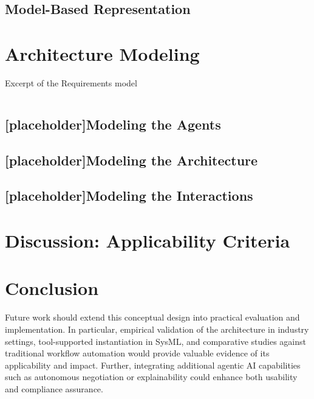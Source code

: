 \subsection{Model-Based Representation}\label{subsec:req-model}


\section{Architecture Modeling}\label{sec:mod-mas}
\begin{listing}[h]
    \caption{Excerpt of the Requirements model}
    \inputminted[firstline=1,lastline=25]{text}{ressources/models/requirements.sysml}
\end{listing}
\subsection{[placeholder]Modeling the Agents}\label{subsec:mod-agents}
\subsection{[placeholder]Modeling the Architecture}\label{subsec:mod-arch}
\subsection{[placeholder]Modeling the Interactions}\label{subsec:mod-interactions}

\section{Discussion: Applicability Criteria}\label{sec:discussion}
    
\section{Conclusion}\label{sec:conclussion}
Future work should extend this conceptual design into practical evaluation and implementation. In particular, empirical validation of the architecture in industry settings, tool-supported instantiation in SysML, and comparative studies against traditional workflow automation would provide valuable evidence of its applicability and impact. Further, integrating additional agentic AI capabilities such as autonomous negotiation or explainability could enhance both usability and compliance assurance.
\clearpage